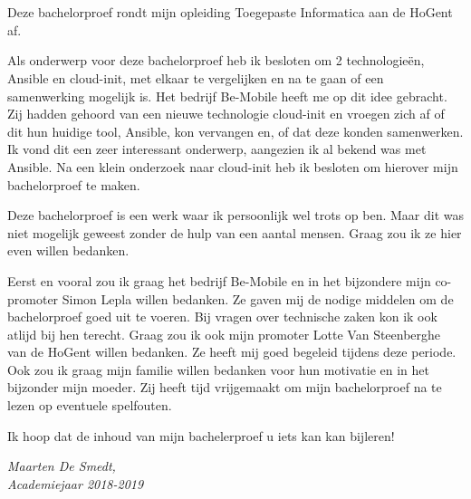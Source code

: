 
\chapter*{}
\label{ch:voorwoord}


Deze bachelorproef rondt mijn opleiding Toegepaste Informatica aan de HoGent af. 

Als onderwerp voor deze bachelorproef heb ik besloten om 2 technologieën, Ansible en cloud-init, met elkaar te vergelijken en na te gaan of een samenwerking mogelijk is. Het bedrijf Be-Mobile heeft me op dit idee gebracht. Zij hadden gehoord van een nieuwe technologie cloud-init en vroegen zich af of dit hun huidige tool, Ansible, kon vervangen en, of dat deze konden samenwerken. Ik vond dit een zeer interessant onderwerp, aangezien ik al bekend was met Ansible. Na een klein onderzoek naar cloud-init heb ik besloten om hierover mijn bachelorproef te maken.

Deze bachelorproef is een werk waar ik persoonlijk wel trots op ben. Maar dit was niet mogelijk geweest zonder de hulp van een aantal mensen. Graag zou ik ze hier even willen bedanken. 

Eerst en vooral zou ik graag het bedrijf Be-Mobile en in het bijzondere mijn co-promoter Simon Lepla willen bedanken. Ze gaven mij de nodige middelen om de bachelorproef goed uit te voeren. Bij vragen over technische zaken kon ik ook atlijd bij hen terecht. Graag zou ik ook mijn promoter Lotte Van Steenberghe van de HoGent willen bedanken. Ze heeft mij goed begeleid tijdens deze periode. Ook zou ik graag mijn familie willen bedanken voor hun motivatie en in het bijzonder mijn moeder. Zij heeft tijd vrijgemaakt om mijn bachelorproef na te lezen op eventuele spelfouten.

Ik hoop dat de inhoud van mijn bachelerproef u iets kan kan bijleren!
\begin{flushright}
    \textit{Maarten De Smedt,} \\ 
    \textit{Academiejaar 2018-2019}
\end{flushright}
